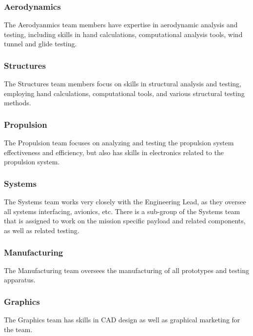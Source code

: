 \subsubsection{Aerodynamics} The Aerodyanmics team members have expertise in aerodynamic analysis and testing, including skills in hand calculations, computational analysis tools, wind tunnel and glide testing.
\subsubsection{Structures} The Structures team members focus on skills in structural analysis and testing, employing hand calculations, computational tools, and various structural testing methods.
\subsubsection{Propulsion} The Propulsion team focuses on analyzing and testing the propulsion system effectiveness and efficiency, but also has skills in electronics related to the propulsion system.
\subsubsection{Systems} The Systems team works very closely with the Engineering Lead, as they oversee all systems interfacing, avionics, etc.  There is a sub-group of the Systems team that is assigned to work on the mission specific payload and related components, as well as related testing. %
\subsubsection{Manufacturing} The Manufacturing team oversees the manufacturing of all prototypes and testing apparatus.
\subsubsection{Graphics} The Graphics team has skills in CAD design as well as graphical marketing for the team. 
